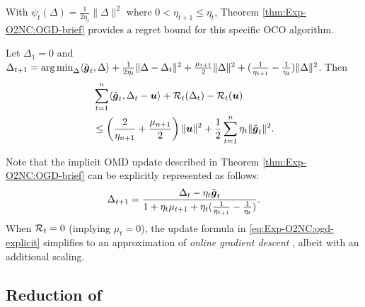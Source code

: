 

With $\psi_t(\Delta) = \frac{1}{2\eta_t}\|\Delta\|^2$ where $0<\eta_{t+1}\le \eta_t$, Theorem \ref{thm:Exp-O2NC:OGD-brief} provides a regret bound for this specific OCO algorithm.

\begin{theorem}
\label{thm:Exp-O2NC:OGD-brief}
Let $\Delta_1=0$ and $\Delta_{t+1} = \mathop{\operatorname{arg\,min}}_\Delta \langle\tilde{{\boldsymbol{g}}}_t,\Delta\rangle + \frac{1}{2\eta_t}\|\Delta-\Delta_t\|^2 + \frac{\mu_{t+1}}{2}\|\Delta\|^2 + (\frac{1}{\eta_{t+1}}-\frac{1}{\eta_t})\|\Delta\|^2$. Then
\begin{align*}
    &\sum_{t=1}^n \langle \tilde{{\boldsymbol{g}}}_t, \Delta_t-{\boldsymbol{u}}\rangle + {\cal R}_t(\Delta_t) - {\cal R}_t({\boldsymbol{u}}) \\
    &\le \left(\frac{2}{\eta_{n+1}} + \frac{\mu_{n+1}}{2}\right)\|{\boldsymbol{u}}\|^2 + \frac{1}{2}\sum_{t=1}^n \eta_t\|\tilde{{\boldsymbol{g}}}_t\|^2.
\end{align*}
\end{theorem}

Note that the implicit OMD update described in Theorem \ref{thm:Exp-O2NC:OGD-brief} can be explicitly represented as follows:
\begin{equation}
    \Delta_{t+1} = \frac{\Delta_t-\eta_t\tilde{{\boldsymbol{g}}}_t}{1+\eta_t\mu_{t+1}+\eta_t(\frac{1}{\eta_{t+1}}-\frac{1}{\eta_t})}.
    \label{eq:Exp-O2NC:ogd-explicit}
\end{equation}
When ${\cal R}_t=0$ (implying $\mu_t=0$), the update formula in \eqref{eq:Exp-O2NC:ogd-explicit} simplifies to an approximation of \emph{online gradient descent} \cite{zinkevich2003online}, albeit with an additional scaling.


\subsection{Reduction of \alg}

